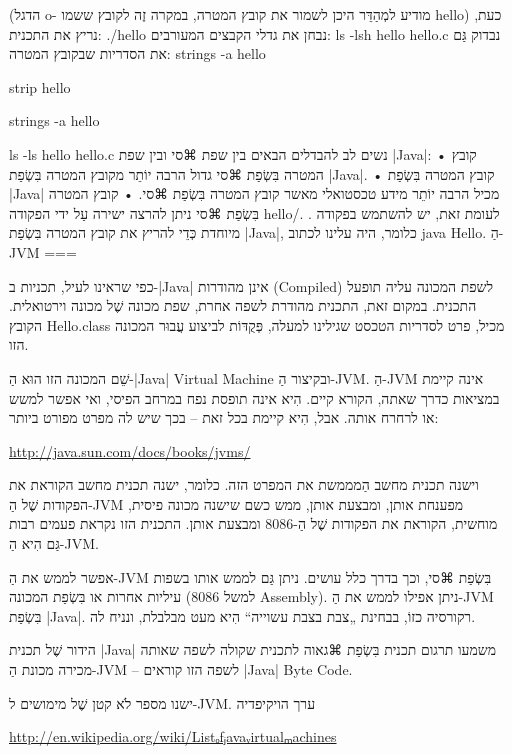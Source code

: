 (הדגל o- מודיע למְהַדֵּר היכן לשמור את קובץ המטרה, במקרה זֶה לקובץ ששמו
hello)
כעת, נריץ את התכנית:
./hello
\END
נבחן את גדלי הקבצים המעורבים:
ls -lsh hello hello.c
\END
נבדוק גַּם את הסדריות שבקובץ המטרה:
strings -a hello
\END

strip hello
\END

strings -a hello
\END

ls -ls hello hello.c
\END
נשים לב להבדלים הבאים בין שפת ⌘סי ובין שפת \E|Java|:
• קובץ המטרה בִּשְׂפַת ⌘סי גדול הרבה יוֹתֵר מקובץ המטרה בִּשְׂפַת
|Java|.
• קובץ המטרה בִּשְׂפַת \E|Java| מכיל הרבה יוֹתֵר מידע טכסטואלי מאשר קובץ
המטרה בִּשְׂפַת ⌘סי.
• קובץ המטרה בִּשְׂפַת ⌘סי ניתן להרצה ישירה עַל ידי הפקודה hello/.
. לעומת זאת, יש להשתמש בפקודה מיוחדת כְּדֵי להריץ את קובץ המטרה
בִּשְׂפַת \E|Java|, כלומר, היה עלינו לכתוב java Hello.
הַ-JVM
===

כפי שראינו לעיל, תכניות ב-|Java| אינן מהודרות (Compiled) לשפת המכונה עליה
תופעל התכנית. במקום זאת, התכנית מהודרת לשפה אחרת, שפת מכונה שֶׁל
מכונה וירטואלית. הקובץ Hello.class מכיל, פרט לסדריות הטכסט שגילינו למעלה,
פְּקֻדּוֹת לביצוע עֲבוּר המכונה הזו.

שֵׁם המכונה הזו הוּא הַ-|Java| Virtual Machine ובקיצור הַ-JVM. הַ-JVM אינה
קיימת במציאות כדרך שאתה, הקורא קיים. הִיא אינה תופסת נפח במרחב הפיסי, ואי אפשר
למשש או לרחרח אותה. אבל, הִיא קיימת בכל זאת – בכך שיש לה מפרט מפורט ביותר:
\begin{english}
\url{http://java.sun.com/docs/books/jvms/}
\end{english}

וישנה תכנית מחשב הַמממשת את המפרט הזה. כלומר, ישנה תכנית מחשב הקוראת
את הפקודות שֶׁל הַ-JVM מפענחת אותן, ומבצעת אותן, ממש כשם שישנה מכונה פיסית,
מוחשית, הקוראת את הפקודות שֶׁל הַ-8086 ומבצעת אותן. התכנית הזו נקראת
פעמים רבות גַּם הִיא הַ-JVM.

אפשר לממש את הַ-JVM בִּשְׂפַת ⌘סי, וכך בדרך כלל עושים. ניתן גַּם לממש אותו
בשפות עיליות אחרות או בִּשְׂפַת המכונה (למשל 8086 Assembly). ניתן אפילו לממש
את הַ-JVM בִּשְׂפַת \E|Java|. רקורסיה כזוֹ, בבחינת „צבת בצבת עשוייה“ הִיא מעט
מבלבלת, ונניח לה.

הידור שֶׁל תכנית \E|Java| משמעו תרגום תכנית בִּשְׂפַת ⌘גאוה לתכנית שקולה
לשפה שאותה מכירה מכונת הַ-JVM – לשפה הזו קוראים \E|Java| Byte Code.

ישנו מספר לֹא קטן שֶׁל מימושים ל-JVM. ערך הויקיפדיה
\begin{english}
\url{http://en.wikipedia.org/wiki/Listₒfⱼavaᵥirtualₘachines}
\end{english}

